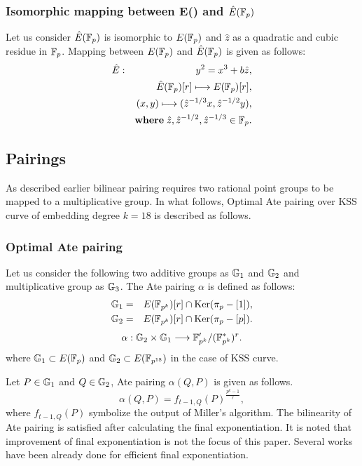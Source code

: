 \subsubsection{Isomorphic mapping  between \texorpdfstring{E(\Fp) and $\hat{E}({\mathbb{F}}_{p})$}{E(Fp) and E'(Fp)}}
Let us consider $\hat{E}({\mathbb{F}}_{p})$  is isomorphic to $E({\mathbb{F}}_{p})$ and $\hat{z}$ as a quadratic and cubic residue in ${\mathbb{F}}_{p}$. Mapping between $E({\mathbb{F}}_{p})$ and $\hat{E}({\mathbb{F}}_{p})$ is given as follows:
\begin{eqnarray}
	\hat{E}&:&y^2=x^3+b\hat{z},\nonumber\\
	&&\hat{E}({\mathbb{F}}_{p})[r]\longmapsto E({\mathbb{F}}_{p})[r],\nonumber\\
	&&(x,y)\longmapsto (\hat{z}^{-1/3}x,\hat{z}^{-1/2}y),\nonumber\\
	&&{\bf where} \;\hat{z}, \hat{z}^{-1/2},\hat{z}^{-1/3}\in {\mathbb{F}}_{p}\label{map2}.
\end{eqnarray}
\subsection{Pairings}
As described earlier bilinear pairing requires two rational point groups to be mapped to a multiplicative group. In what follows,  Optimal Ate pairing over KSS curve of embedding degree $k = 18$ is described as follows.
\subsubsection{Optimal Ate pairing}
Let us consider the following two additive groups as ${\mathbb{G}}_{1}$ and ${\mathbb{G}}_{2}$ and multiplicative group as ${\mathbb{G}}_{3}$. The Ate pairing $\alpha$ is defined as follows:
\begin{eqnarray}
	{\mathbb{G}}_{1}&=&E(\mathbb{F}_{p^k})[r]\cap {\rm Ker}(\pi_p-[1])\nonumber,\\
	{\mathbb{G}}_{2}&=&E(\mathbb{F}_{p^k})[r]\cap {\rm Ker}(\pi_p-[p])\nonumber.
\end{eqnarray}
\begin{eqnarray}
	\alpha:{\mathbb{G}}_{2}\times{\mathbb{G}}_{1}\longrightarrow\mathbb{F}_{p^k}'/(\mathbb{F}_{p^k}^*)^r.
\end{eqnarray}
where ${\mathbb{G}}_{1} \subset E(\mathbb{F}_p)$ and ${\mathbb{G}}_{2} \subset E(\mathbb{F}_{p^{18}})$  in the case of KSS curve.

Let $P \in {\mathbb{G}}_{1}$ and $Q\in{\mathbb{G}}_{2}$, Ate pairing $\alpha(Q,P)$ is given as follows.
\begin{equation}
	\alpha(Q,P)=f_{t-1,Q}(P)^{\frac{p^k-1}{r}},
\end{equation}
where $f_{t-1,Q}(P)$ symbolize the output of Miller's algorithm. The bilinearity of Ate pairing is satisfied after calculating the final exponentiation. It is noted that improvement of final exponentiation is not the focus of this paper. Several works \cite{EPRINT:ShiTakOka06, PAIRING:SBCDK09a} have been already done for efficient final exponentiation.


